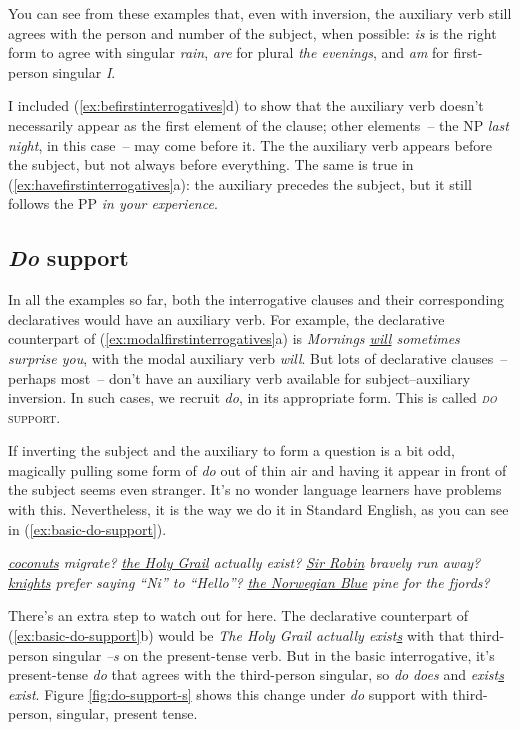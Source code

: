 You can see from these examples that, even with inversion, the auxiliary verb still agrees with the person and number of the subject, when possible: \textit{is} is the right form to agree with singular \textit{rain}, \textit{are} for plural \textit{the evenings}, and \textit{am} for first-person singular \textit{I}. 

I included (\ref{ex:befirstinterrogatives}d) to show that the auxiliary verb doesn't necessarily appear as the first element of the clause; other elements~-- the NP \textit{last night}, in this case~-- may come before it. The the auxiliary verb appears before the subject, but not always before everything. The same is true in (\ref{ex:havefirstinterrogatives}a): the auxiliary precedes the subject, but it still follows the PP \textit{in your experience}.


\subsection{\textit{Do} support}\label{sec:basic-do-support}

In all the examples so far, both the interrogative clauses and their corresponding declaratives would have an auxiliary verb. For example, the declarative counterpart of (\ref{ex:modalfirstinterrogatives}a) is \textit{Mornings \uline{will} {\op}sometimes{\cp} surprise you}, with the modal auxiliary verb \textit{will}. But lots of declarative clauses~-- perhaps most~-- don't have an auxiliary verb available for subject--auxiliary inversion. In such cases, we recruit \textit{do}, in its appropriate form. This is called \textsc{\textit{do} support}. 

If inverting the subject and the auxiliary to form a question is a bit odd, magically pulling some form of \textit{do} out of thin air and having it appear in front of the subject seems even stranger. It's no wonder language learners have problems with this. Nevertheless, it is the way we do it in Standard English, as you can see in (\ref{ex:basic-do-support}).

\ea \label{ex:basic-do-support}
    \ea \textit{ \uline{coconuts} migrate?}
        \ex \textit{ \uline{the Holy Grail} actually exist?}
        \ex \textit{ \uline{Sir Robin} bravely run away?}
        \ex \textit{ \uline{knights} prefer saying ``Ni'' to ``Hello''?}
        \ex \textit{ \uline{the Norwegian Blue} pine for the fjords?}
    \z
\z

There's an extra step to watch out for here. The declarative counterpart of (\ref{ex:basic-do-support}b) would be \textit{The Holy Grail actually exist\uline{s}} with that third-person singular \textit{--s} on the present-tense verb. But in the basic interrogative, it's present-tense \textit{do} that agrees with the third-person singular, so \textit{do} \rightarrow \textit{does} and \textit{exist\uline{s}} \rightarrow \textit{exist}. Figure \ref{fig:do-support-s} shows this change under \textit{do} support with third-person, singular, present tense.

